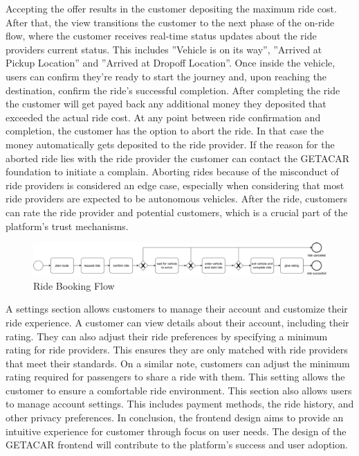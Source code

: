 Accepting the offer results in the customer depositing the maximum ride cost. After that, the view  transitions the customer to the next phase of the on-ride flow, where the customer receives real-time status updates about the ride providers current status. This includes ''Vehicle is on its way'', ''Arrived at Pickup Location'' and ''Arrived at Dropoff Location''. Once inside the vehicle, users can confirm they're ready to start the journey and, upon reaching the destination, confirm the ride's successful completion. After completing the ride the customer will get payed back any additional money they deposited that exceeded the actual ride cost. At any point between ride confirmation and completion, the customer has the option to abort the ride. In that case the money automatically gets deposited to the ride provider. If the reason for the aborted ride lies with the ride provider the customer can contact the GETACAR foundation to initiate a complain. Aborting rides because of the misconduct of ride providers is considered an edge case, especially when considering that most ride providers are expected to be autonomous vehicles.  After the ride, customers can rate the ride provider and potential customers, which is a crucial part of the platform's trust mechanisms.

\begin{figure}[h]
    \centering
    \includegraphics[width=\linewidth]{data/3.svg}
    \caption{Ride Booking Flow}
    \label{fig:directSVG}
\end{figure}

A settings section allows customers to manage their account and customize their ride experience. A customer can view details about their account, including their rating. They can also adjust their ride preferences by specifying a minimum rating for ride providers. This ensures they are only matched with ride providers that meet their standards. On a similar note, customers can adjust the minimum rating required for passengers to share a ride with them. This setting allows the customer to ensure a comfortable ride environment. This section also allows users to manage account settings. This includes payment methods, the ride history, and other privacy preferences. In conclusion, the frontend design aims to provide an intuitive experience for customer through focus on user needs. The design of the GETACAR frontend will contribute to the platform's success and user adoption.

